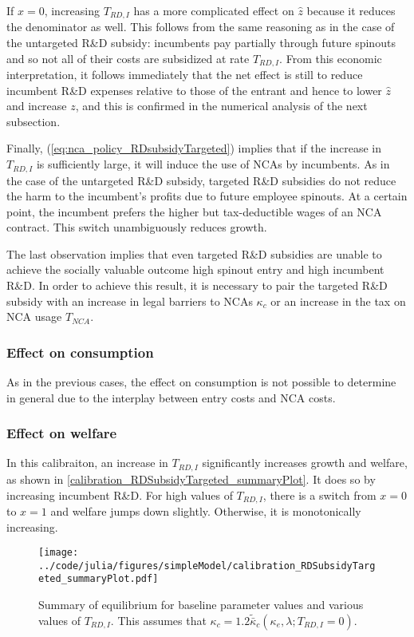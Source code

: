 \documentclass[11pt,english]{article}
\theoremstyle{remark}
\begin{document}
If $x = 0$, increasing $T_{RD,I}$ has a more complicated effect on $\hat{z}$ because it reduces the denominator as well. This follows from the same reasoning as in the case of the untargeted R\&D subsidy: incumbents pay partially through future spinouts and so not all of their costs are subsidized at rate $T_{RD,I}$. From this economic interpretation, it follows immediately that the net effect is still to reduce incumbent R\&D expenses relative to those of the entrant and hence to lower $\hat{z}$ and increase $z$, and this is confirmed in the numerical analysis of the next subsection.

Finally, (\ref{eq:nca_policy_RDsubsidyTargeted}) implies that if the increase in $T_{RD,I}$ is sufficiently large, it will induce the use of NCAs by incumbents. As in the case of the untargeted R\&D subsidy, targeted R\&D subsidies do not reduce the harm to the incumbent's profits due to future employee spinouts. At a certain point, the incumbent prefers the higher but tax-deductible wages of an NCA contract. This switch unambiguously reduces growth.

The last observation implies that even targeted R\&D subsidies are unable to achieve the socially valuable outcome high spinout entry and high incumbent R\&D. In order to achieve this result, it is necessary to pair the targeted R\&D subsidy with an increase in legal barriers to NCAs $\kappa_c$ or an increase in the tax on NCA usage $T_{NCA}$. 

\subsubsection{Effect on consumption}

As in the previous cases, the effect on consumption is not possible to determine in general due to the interplay between entry costs and NCA costs. 

\subsubsection{Effect on welfare}

In this calibraiton, an increase in $T_{RD,I}$ significantly increases growth and welfare, as shown in \autoref{calibration_RDSubsidyTargeted_summaryPlot}. It does so by increasing incumbent R\&D. For high values of $T_{RD,I}$, there is a switch from $x = 0$ to $x = 1$ and welfare jumps down slightly. Otherwise, it is monotonically increasing. 

\begin{figure}[]
	\texttt{[image: ../code/julia/figures/simpleModel/calibration\_RDSubsidyTargeted\_summaryPlot.pdf]}
	\caption{Summary of equilibrium for baseline parameter values and various values of $T_{RD,I}$. This assumes that $\kappa_c = 1.2 \tilde{\bar{\kappa}}_c(\kappa_e,\lambda;T_{RD,I} = 0)$.}
	\label{calibration_RDSubsidyTargeted_summaryPlot}
\end{figure}
\end{document}
